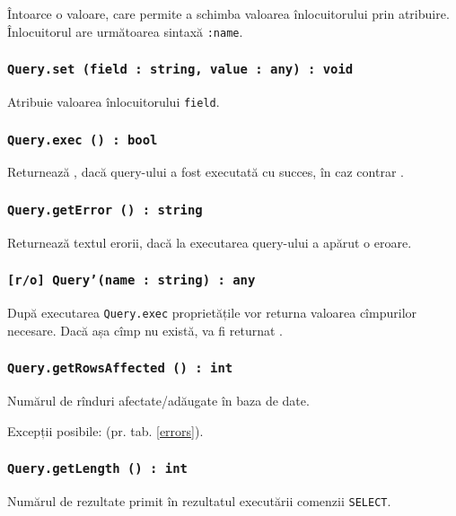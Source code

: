 Întoarce o valoare, care permite a schimba valoarea înlocuitorului prin atribuire. Înlocuitorul are următoarea sintaxă \texttt{:name}.

\subsubsection{\texttt{Query.set (field : string, value : any) : void}}

Atribuie valoarea înlocuitorului \texttt{field}.

\subsubsection{\texttt{Query.exec () : bool}}

Returnează \true, dacă query-ului a fost executată cu succes, în caz contrar \false.

\subsubsection{\texttt{Query.getError () : string}}

Returnează textul erorii, dacă la executarea query-ului a apărut o eroare.

\subsubsection{\texttt{[r/o] Query'(name : string) : any}}

După executarea \texttt{Query.exec} proprietățile vor returna valoarea cîmpurilor necesare. Dacă așa cîmp nu există, va fi returnat \void.

\subsubsection{\texttt{Query.getRowsAffected () : int}}

Numărul de rînduri afectate/adăugate în baza de date.

Excepții posibile:  (pr. tab. \ref{errors}).

\subsubsection{\texttt{Query.getLength () : int}}

Numărul de rezultate primit în rezultatul executării comenzii \texttt{SELECT}.

